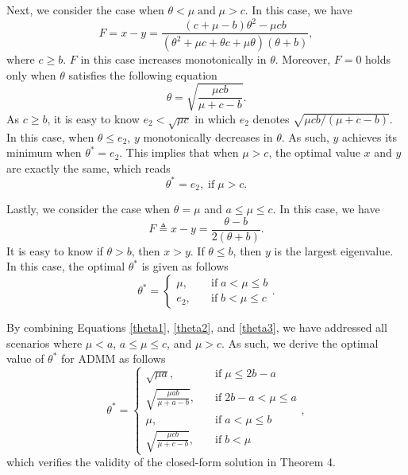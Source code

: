 \documentclass[letterpaper]{article} %
\begin{document}
Next, we consider the case when $\theta<\mu\; \text{and} \;\mu>c  $. In this case, we have 
\begin{equation*}
  	F = x-y =\frac{\left(c + \mu - b\right)\theta^2 - \mu cb}{(\theta^2+\mu c+\theta c+\mu\theta)(\theta+b)},
  \end{equation*}
where $c \geqslant b $. $F$ in this case increases monotonically in $\theta$. Moreover, $F=0$ holds only when $\theta$ satisfies the following equation
 \begin{equation*}
 	\theta = \sqrt{\frac{\mu c b}{\mu+c-b}}.
 \end{equation*}
As $c \geqslant b $, it is easy to know $e_2 < \sqrt{\mu c}$ in which $e_2$ denotes $\sqrt{\mu cb/(\mu+c-b)}$. In this case, when $\theta \leq e_2$, $y$ monotonically decreases in $\theta$. As such, $y$ achieves its minimum when $\theta^*=e_2$. This implies that when $\mu> c$, the optimal value $x$ and $y$ are exactly the same, which reads
\begin{equation}\label{theta2}
\theta^* =e_2,\;\text{if} \;\mu>c.
\end{equation}


Lastly, we consider the case when $\theta=\mu$ and $a\leq \mu \leq c$. In this case, we have 
\begin{equation*}
F \triangleq x-y =\frac{\theta-b}{2(\theta+b)}.
\end{equation*}
It is easy to know if $\theta>b$, then $x > y$. If $\theta\leq b$, then $y$ is the largest eigenvalue. In this case, the optimal $\theta^*$ is given as follows
 \begin{equation}\label{theta3}
	\theta^*=
	\begin{cases}
		\mu,\quad & \text{if}\;a< \mu \leq b \\
            e_2,\quad & \text{if}\;b< \mu \leq c
	\end{cases}.
\end{equation}

By combining Equations \eqref{theta1}, \eqref{theta2}, and \eqref{theta3}, we have addressed all scenarios where $\mu<a$, $a\leq \mu \leq c$, and $\mu>c$. As such, we derive the optimal value 
of $\theta^*$ for ADMM as follows
\begin{equation*}
	\theta^*=
	\begin{cases}
		\sqrt{\mu a},\quad & \text{if}\;  \mu \leq 2b- a\\
		\sqrt{\frac{\mu a b}{\mu+a-b}},\quad & \text{if}\;  2b - a <\mu \leq a \\
		\mu,\quad & \text{if}\; a < \mu \leq b\\
		\sqrt{\frac{\mu c b}{\mu+c-b}},\quad & \text{if} \;b<\mu	
	\end{cases},
\end{equation*}
which verifies the validity of the closed-form solution in Theorem 4.



\end{document}
